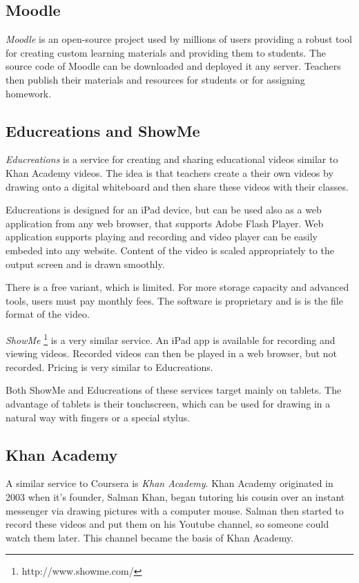 \subsection{Moodle}
\textit{Moodle} \cite{moodle} is an open-source project used by millions of users \cite{moodle_usage} providing a robust tool for creating custom learning materials and providing them to students. The source code of Moodle can be downloaded and deployed it any server. Teachers then publish their materials and resources for students or for assigning homework.




\subsection{Educreations and ShowMe}
\textit{Educreations} is a service for creating and sharing educational videos similar to Khan Academy videos. The idea is that teachers create a their own videos by drawing onto a digital whiteboard and then share these videos with their classes.

Educreations is designed for an iPad device, but can be used also as a web application from any web browser, that supports Adobe Flash Player. Web application supports playing and recording and video player can be easily embeded into any website. Content of the video is scaled appropriately to the output screen and is drawn smoothly.

There is a free variant, which is limited. For more storage capacity and advanced tools, users must pay monthly fees. The software is proprietary and is is the file format of the video.

\textit{ShowMe} \footnote{http://www.showme.com/} is a very similar service. An iPad app is available for recording and viewing videos. Recorded videos can then be played in a web browser, but not recorded. Pricing is very similar to Educreations.

Both ShowMe and Educreations of these services target mainly on tablets. The advantage of tablets is their touchscreen, which can be used for drawing in a natural way with fingers or a special stylus.



\subsection{Khan Academy}
A similar service to Coursera is \textit{Khan Academy}. Khan Academy originated in 2003 when it's founder, Salman Khan, began tutoring his cousin over an instant messenger via drawing pictures with a computer mouse. Salman then started to record these videos and put them on his Youtube channel, so someone could watch them later. This channel became the basis of Khan Academy.

